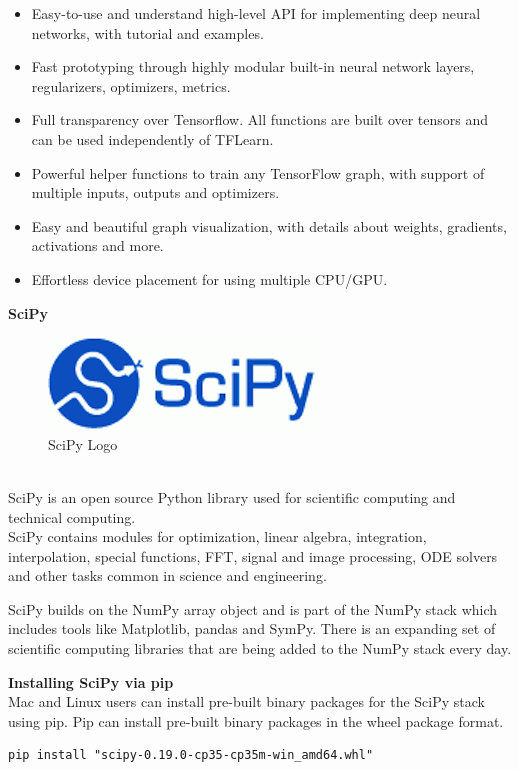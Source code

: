 \begin{itemize}
	\item Easy-to-use and understand high-level API for implementing deep neural networks, with tutorial and examples.
	\item Fast prototyping through highly modular built-in neural network layers, regularizers, optimizers, metrics.
	\item Full transparency over Tensorflow. All functions are built over tensors and can be used independently of TFLearn.
	\item Powerful helper functions to train any TensorFlow graph, with support of multiple inputs, outputs and optimizers.
	\item Easy and beautiful graph visualization, with details about weights, gradients, activations and more.
	\item Effortless device placement for using multiple CPU/GPU.
\end{itemize}
\textbf{{\Large SciPy}}
\begin{figure}[h]
	\centering\includegraphics[scale=0.75]{images/scipy.png}
	\caption{SciPy Logo}
\end{figure}\\SciPy is an open source Python library used for scientific computing and technical computing.\\SciPy contains modules for optimization, linear algebra, integration, interpolation, special functions, FFT, signal and image processing, ODE solvers and other tasks common in science and engineering.

SciPy builds on the NumPy array object and is part of the NumPy stack which includes tools like Matplotlib, pandas and SymPy. There is an expanding set of scientific computing libraries that are being added to the NumPy stack every day.

\noindent\textbf{Installing SciPy via pip}\\
Mac and Linux users can install pre-built binary packages for the SciPy stack using pip. Pip can install pre-built binary packages in the wheel package format.
\begin{lstlisting}
pip install "scipy-0.19.0-cp35-cp35m-win_amd64.whl"
\end{lstlisting}


